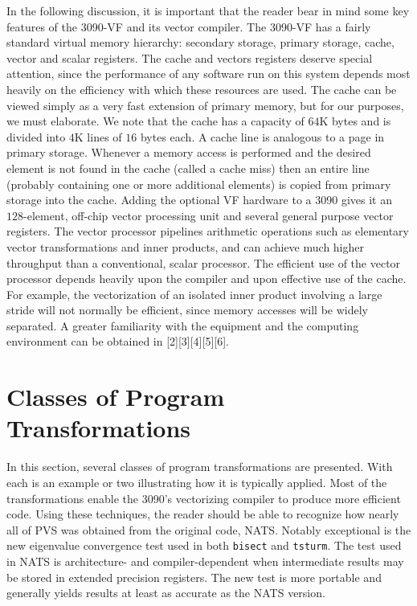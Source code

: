 In the following discussion, it is important that the reader bear in mind some
key features of the 3090-VF and its vector compiler.
The 3090-VF has a fairly standard virtual memory hierarchy: secondary storage,
primary storage, cache, vector and scalar registers.
The cache and vectors registers deserve special attention,
since the performance of any software run on this system depends
most heavily on the efficiency with which these resources are used.
The cache can be viewed simply as a very fast extension of primary
memory, but for our purposes, we must elaborate.
We note that the cache has a capacity of $64$K bytes and is divided into $4$K
lines of $16$ bytes each.
A cache line is analogous to a page in primary storage.
Whenever a memory access is performed and the desired element is not found
in the cache (called a cache miss) then an entire line (probably containing
one or more additional elements) is copied from primary storage into the cache.
Adding the optional VF hardware to a 3090 gives it an $128$-element, off-chip
vector processing unit and several general purpose vector registers.
The vector processor pipelines arithmetic operations such as elementary vector
transformations and inner products, and can achieve much higher throughput
than a conventional, scalar processor.
The efficient use of the vector processor depends heavily upon the compiler
and upon effective use of the cache.  For example, the vectorization of an
isolated inner product involving a large stride will not normally be efficient,
since memory accesses will be widely separated.
A greater familiarity with the equipment and the computing environment
can be obtained in [2][3][4][5][6].

\section{Classes of Program Transformations}

In this section, several classes of program transformations are presented.
With each is an example or two illustrating how it is typically applied.
Most of the transformations enable the 3090's vectorizing compiler to produce
more efficient code.  Using these techniques, the reader should be able to
recognize how nearly all of PVS was obtained from the original code, NATS.
Notably exceptional is the new eigenvalue convergence test used in both
{\tt bisect} and {\tt tsturm}.  The test used in NATS is architecture-
and compiler-dependent when intermediate results may be stored in extended
precision registers.  The new test is more portable and generally yields
results at least as accurate as the NATS version.

